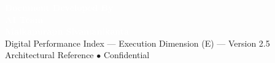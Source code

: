 \documentclass[11pt,a4paper]{article}
\begin{document}
\vspace{1cm}
\begin{tcolorbox}[enhanced, colback=dpiblue, colframe=dpiblue, boxrule=0pt, arc=2mm]
\begin{center}
\textcolor{white}{\textbf{\Large Document Developed By}}\\[0.15cm]
\textcolor{white}{\textbf{\Large AI Team}}\\[0.15cm]
\textcolor{white}{\textbf{\Large Malkapurapu Sivamanikanta}}\\[0.3cm]
\textcolor{dpicloud}{\small Digital Performance Index --- Execution Dimension (E) --- Version 2.5}\\[0.1cm]
\textcolor{dpicloud}{\small Architectural Reference $\bullet$ Confidential}
\end{center}
\end{tcolorbox}
\end{document}
